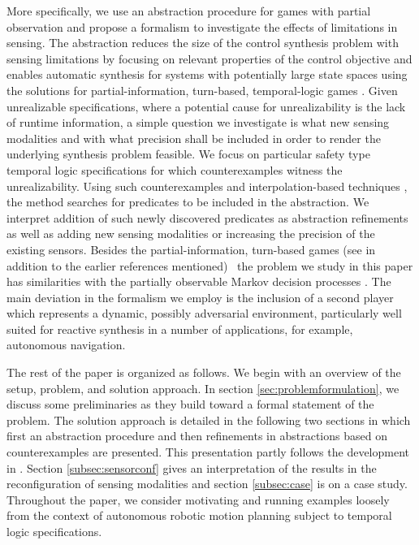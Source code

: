 \documentclass[letterpaper, 10 pt, conference]{ieeeconf}
\begin{document}
More specifically, we use an abstraction procedure for games with
partial observation \cite{rayna-report} and propose a formalism to
investigate the effects of limitations in sensing. The abstraction
reduces the size of the control synthesis problem with sensing
limitations by focusing on relevant properties of the control
objective and enables automatic synthesis for systems with potentially
large state spaces using the solutions for partial-information,
turn-based, temporal-logic games \cite{apt2011lectures,
    chatterjee2006algorithms}. Given unrealizable specifications,
where a potential cause for unrealizability is the lack of runtime
information, a simple question we investigate is
what new sensing modalities and with what precision shall be included
in order to render the underlying synthesis problem feasible. We focus on
particular safety type temporal logic specifications for which
counterexamples witness the unrealizability. Using such
counterexamples and interpolation-based techniques
\cite{cimatti2012smt}, the method searches for predicates to be
included in the abstraction. We interpret addition of such
newly discovered predicates as abstraction refinements as well as
adding new sensing modalities or increasing the precision of the
existing sensors.
Besides the partial-information, turn-based games (see
\cite{arnold2003games,Martin2006} in addition to the earlier
references mentioned)  the problem we study in this paper has
similarities with the partially observable Markov decision processes
\cite{kaelbling1998planning,pineau2002high,kurniawati2008sarsop}. The
main deviation in the formalism we employ is the inclusion of a second
player which represents a dynamic, possibly adversarial environment,
particularly well suited for reactive synthesis in a number of
applications, for example, autonomous navigation.

The rest of the paper is organized as follows. We begin with an
overview of the setup, problem, and solution approach. In section
\ref{sec:problemformulation}, we discuss some preliminaries as they
build toward a formal statement of the problem. The solution approach
is detailed in the following two sections in which first an
abstraction procedure and then refinements in abstractions based on
counterexamples are presented. This presentation partly follows the
development in \cite{rayna-report}. Section \ref{subsec:sensorconf}
gives an interpretation of the results in the reconfiguration of
sensing modalities and section \ref{subsec:case} is on a case
study. Throughout the paper, we consider motivating and running
examples loosely from the context of autonomous robotic motion
planning subject to temporal logic specifications.
\end{document}
